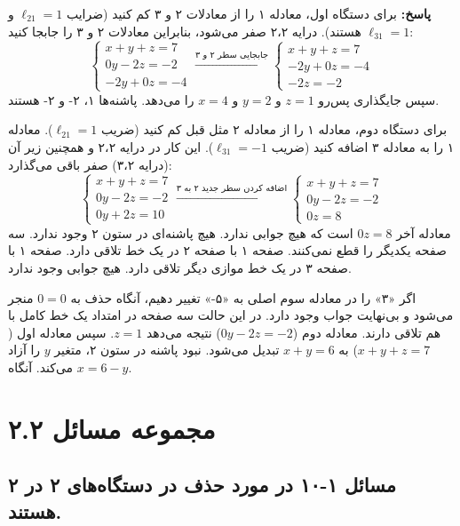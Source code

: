 \documentclass[12pt, a4paper]{book}
\theoremstyle{translator}
\begin{document}
	\textbf{پاسخ:}
	برای دستگاه اول، معادله ۱ را از معادلات ۲ و ۳ کم کنید (ضرایب $\ell_{21}=1$ و $\ell_{31}=1$ هستند). درایه ۲،۲ صفر می‌شود، بنابراین معادلات ۲ و ۳ را جابجا کنید:
	\[
	\begin{cases}
		x+y+z=7 \\
		0y-2z=-2 \\
		-2y+0z=-4
	\end{cases}
	\xrightarrow{\text{جابجایی سطر ۲ و ۳}}
	\begin{cases}
		x+y+z=7 \\
		-2y+0z=-4 \\
		-2z=-2
	\end{cases}
	\]
	سپس جایگذاری پس‌رو $z=1$ و $y=2$ و $x=4$ را می‌دهد. پاشنه‌ها ۱، ۲- و ۲- هستند.
	
	برای دستگاه دوم، معادله ۱ را از معادله ۲ مثل قبل کم کنید (ضریب $\ell_{21}=1$). معادله ۱ را به معادله ۳ اضافه کنید (ضریب $\ell_{31}=-1$). این کار در درایه ۲،۲ و همچنین زیر آن (درایه ۳،۲) صفر باقی می‌گذارد:
	\[
	\begin{cases}
		x+y+z=7 \\
		0y-2z=-2 \\
		0y+2z=10
	\end{cases}
	\xrightarrow{\text{اضافه کردن سطر جدید ۲ به ۳}}
	\begin{cases}
		x+y+z=7 \\
		0y-2z=-2 \\
		0z=8
	\end{cases}
	\]
	معادله آخر $0z=8$ است که هیچ جوابی ندارد. هیچ پاشنه‌ای در ستون ۲ وجود ندارد. سه صفحه یکدیگر را قطع نمی‌کنند. صفحه ۱ با صفحه ۲ در یک خط تلاقی دارد. صفحه ۱ با صفحه ۳ در یک خط موازی دیگر تلاقی دارد. هیچ جوابی وجود ندارد.
	
	اگر «۳» را در معادله سوم اصلی به «۵-» تغییر دهیم، آنگاه حذف به $0=0$ منجر می‌شود و بی‌نهایت جواب وجود دارد. در این حالت سه صفحه در امتداد یک خط کامل با هم تلاقی دارند. معادله دوم ($0y-2z=-2$) نتیجه می‌دهد $z=1$. سپس معادله اول ($x+y+z=7$) به $x+y=6$ تبدیل می‌شود. نبود پاشنه در ستون ۲، متغیر $y$ را آزاد می‌کند. آنگاه $x=6-y$.
	
	\newpage
	\section*{مجموعه مسائل ۲.۲}
	\subsection*{مسائل ۱-۱۰ در مورد حذف در دستگاه‌های ۲ در ۲ هستند.}
	
\end{document}
